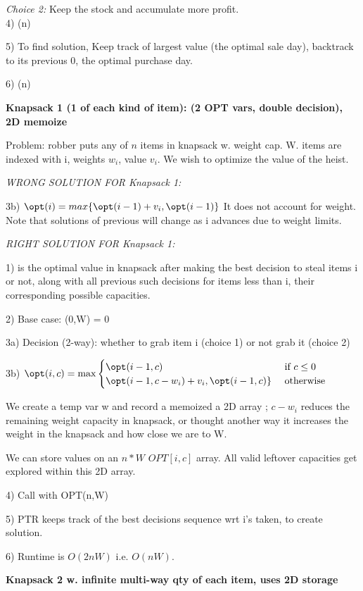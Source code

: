 {\em Choice 2:} Keep the stock and accumulate more profit.\\

4) \opt(n)

5) To find solution, Keep track of largest value (the optimal sale day), 
backtrack to its previous 0, the optimal purchase day.

6) \opt(n) 

{\bf Knapsack 1 (1 of each kind of item): (2 OPT vars, double decision), 2D memoize}

Problem: robber puts any of $n$ items in knapsack w. weight cap. W.  
items are indexed with i, weights $w_i$, value $v_i$.
We wish to optimize the value of the heist.

{\em WRONG SOLUTION FOR Knapsack 1:}

3b) $\opt(i) = max\{ \opt(i-1) + v_i, \opt(i-1) \}$ 
It does not account for weight.  Note that solutions of previous \opt[i] will 
change as i advances due to weight limits.

{\em RIGHT SOLUTION FOR Knapsack 1:}

1) \opt[i,c] is the optimal value in knapsack after making the best decision to 
    steal items i or not, along with all previous such decisions for items less than i,
    their corresponding possible capacities. 

2) Base case: \opt(0,W) = 0

3a) Decision (2-way): whether to grab item i (choice 1) or not grab it (choice 2)

3b) $\opt(i,c) = \max
\begin{cases}
\opt(i-1, c)                   & \text{ if } c\le 0\\
\opt(i-1,c-w_i) + v_i, \opt(i-1, c) \}  & \text{ otherwise } 
\end{cases}$

We create a temp var w and record a memoized a 2D array \opt[i,w];  
$c - w_i$ reduces the remaining weight capacity in knapsack, or thought another 
way it increases the weight in the knapsack and how close we are to W.

We can store values on an $n*W$ $OPT[i,c]$ array.  All valid leftover capacities 
get explored within this 2D array.

4) Call with OPT(n,W)

5) PTR keeps track of the best decisions sequence wrt i's taken, to create solution.

6) Runtime is $O(2nW)$ i.e. $O(nW)$.

{\bf Knapsack 2 w. infinite multi-way qty of each item, uses 2D storage}

